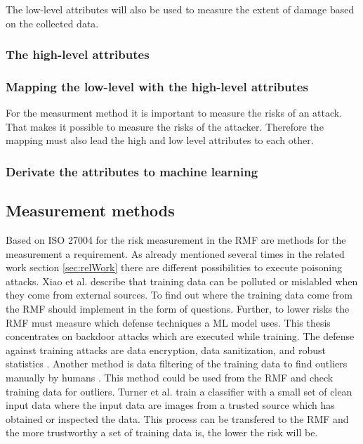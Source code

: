 The low-level attributes will also be used to measure the extent of damage based on the collected data.

\subsubsection*{The high-level attributes}


\subsubsection*{Mapping the low-level with the high-level attributes}

For the measurment method it is important to measure the risks of an attack. That makes it possible to measure the risks of the attacker. Therefore the mapping must also lead the high and low level attributes to each other.

\subsubsection*{Derivate the attributes to machine learning}

\subsection{Measurement methods}

Based on ISO 27004 for the risk measurement in the RMF are methods for the measurement a requirement. As already mentioned several times in the related work section \ref{sec:relWork} there are different possibilities to execute poisoning attacks. Xiao et al. \cite{DBLP:conf/sp/XiaoLZX18} describe that training data can be polluted or mislabled when they come from external sources. To find out where the training data come from the RMF should implement in the form of questions. Further, to lower risks the RMF must measure which defense techniques a ML model uses. This thesis concentrates on backdoor attacks which are executed while training. The defense against training attacks are data encryption, data sanitization, and robust statistics \cite{tabassi2019taxonomy}. Another method is data filtering of the training data to find outliers manually by humans \cite{turner2018clean}. This method could be used from the RMF and check training data for outliers. Turner et al. train a classifier with a small set of clean input data where the input data are images from a trusted source which has obtained or inspected the data. This process can be transfered to the RMF and the more trustworthy a set of training data is, the lower the risk will be.

